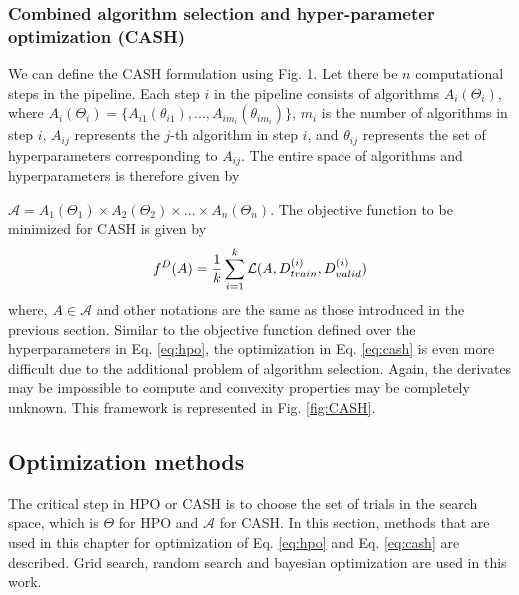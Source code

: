 \subsubsection{Combined algorithm selection and hyper-parameter optimization (CASH)}
\label{subsubsec_CASH}
We can define the CASH formulation using Fig. 1. Let there be $n$ computational steps in the pipeline. Each step $i$ in the pipeline consists of algorithms $A_i(\Theta_i)$, where $A_i(\Theta_i) = \{A_{i1}(\theta_{i1}), ..., A_{im_{i}}(\theta_{im_{i}})\}$, $m_{i}$ is the number of algorithms in step $i$, $A_{ij}$ represents the $j$-th algorithm in step $i$, and \textbf{$\theta_{ij}$} represents the set of hyperparameters corresponding to  $A_{ij}$. The entire space of algorithms and hyperparameters is therefore given by \par
\noindent $\mathcal{A} = A_1(\Theta_1) \times A_2(\Theta_2) \times ... \times A_n(\Theta_n)$. The objective function to be minimized for CASH is given by
\begin{equation}
f^D(A) = \frac{1}{k}\sum_{i=1}^{k} \mathcal{L}(\emph{A}, D_{train}^{(i)}, D_{valid}^{(i)}) 
\label{eq:cash}
\end{equation}
where, $A \in \mathcal{A}$ and other notations are the same as those introduced in the previous section.
Similar to the objective function defined over the hyperparameters in Eq. \ref{eq:hpo}, the optimization in Eq. \ref{eq:cash} is even more difficult due to the additional problem of algorithm selection. Again, the derivates may be impossible to compute and convexity properties may be completely unknown. This framework is represented in Fig. \ref{fig:CASH}.



\subsection{Optimization methods}
\label{optimization}
The critical step in HPO or CASH is to choose the set of trials in the search space, which is $\Theta$ for HPO and $\mathcal{A}$ for CASH. In this section, methods that are used in this chapter for optimization of Eq. \ref{eq:hpo} and Eq. \ref{eq:cash} are described. Grid search, random search and bayesian optimization are used in this work.
